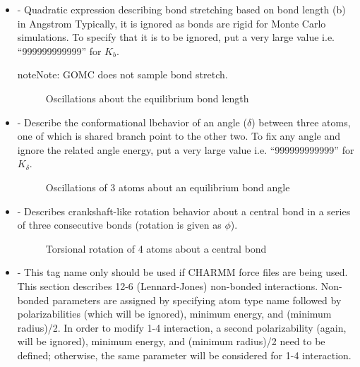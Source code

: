 \documentclass[letterpaper,10pt,english]{sphinxmanual}
\begin{document}
\begin{itemize}
\item {} 
- Quadratic expression describing bond stretching based on bond length (b) in Angstrom
\textendash{} Typically, it is ignored as bonds are rigid for Monte Carlo simulations. To specify that it is to be ignored, put a very large value i.e. “999999999999” for \(K_b\).

\begin{sphinxadmonition}{note}{Note:}
GOMC does not sample bond stretch.
\end{sphinxadmonition}

\begin{figure}[htbp]
\centering
\capstart

\noindent{}
\caption{Oscillations about the equilibrium bond length}\label{\detokenize{input_file:id1}}\end{figure}

\item {} 
- Describe the conformational lbehavior of an angle (\(\delta\)) between three atoms, one of which is shared branch point to the other two. To fix any angle and ignore the related angle energy, put a very large value i.e. “999999999999” for \(K_\delta\).

\begin{figure}[htbp]
\centering
\capstart

\noindent{}
\caption{Oscillations of 3 atoms about an equilibrium bond angle}\label{\detokenize{input_file:id2}}\end{figure}

\item {} 
- Describes crankshaft-like rotation behavior about a central bond in a series of three consecutive bonds (rotation is given as \(\phi\)).

\begin{figure}[htbp]
\centering
\capstart

\noindent{}
\caption{Torsional rotation of 4 atoms about a central bond}\label{\detokenize{input_file:id3}}\end{figure}

\item {} 
- This tag name only should be used if CHARMM force files are being used. This section describes 12-6 (Lennard-Jones) non-bonded interactions. Non-bonded parameters are assigned by specifying atom type name followed by polarizabilities (which will be ignored), minimum energy, and (minimum radius)/2. In order to modify 1-4 interaction, a second polarizability (again, will be ignored), minimum energy, and (minimum radius)/2 need to be defined; otherwise, the same parameter will be considered for 1-4 interaction.


\end{itemize}
\end{document}
